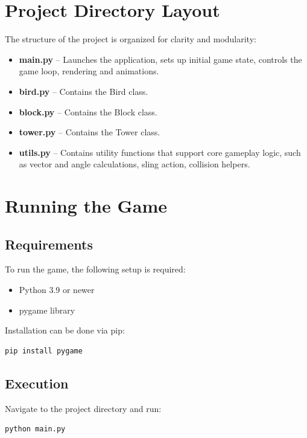 \documentclass[10pt]{article}
\begin{document}
\section{Project Directory Layout}
The structure of the project is organized for clarity and modularity:

\begin{itemize}
    \item \textbf{main.py} – Launches the application, sets up initial game state, controls the game loop, rendering and animations.
    \item \textbf{bird.py} – Contains the Bird class.
    \item \textbf{block.py} – Contains the Block class.
    \item \textbf{tower.py} – Contains the Tower class.
    \item \textbf{utils.py} – Contains utility functions that support core gameplay logic, such as vector and angle calculations, sling action, collision helpers.
\end{itemize}

\section{Running the Game}
\subsection{Requirements}
To run the game, the following setup is required:
\begin{itemize}
    \item Python 3.9 or newer
    \item pygame library
\end{itemize}
Installation can be done via pip:
\begin{verbatim}
pip install pygame
\end{verbatim}

\subsection{Execution}
Navigate to the project directory and run:
\begin{verbatim}
python main.py
\end{verbatim}
\end{document}
